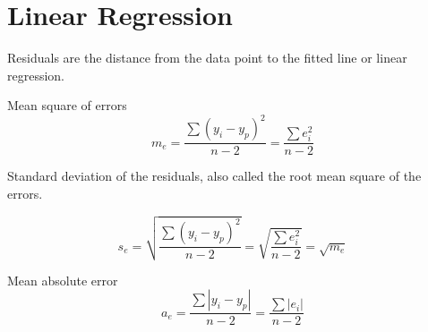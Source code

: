 	\chapter{Linear Regression}
Residuals are the distance from the data point to the fitted line or linear regression.

Mean square of errors
	\begin{equation}
		m_e = \frac{\sum \left(y_i - y_p\right)^2}{n-2} = \frac{\sum e_i^2}{n-2}
	\end{equation}

Standard deviation of the residuals, also called the root mean square of the errors.

	\begin{equation}
		s_e = \sqrt{\frac{\sum \left(y_i - y_p\right)^2}{n-2}} = \sqrt{\frac{\sum e_i^2}{n-2}} = \sqrt{m_e}
	\end{equation}

Mean absolute error
	\begin{equation}
		a_e = \frac{\sum \left|y_i - y_p\right|}{n-2} = \frac{\sum \left|e_i\right|}{n-2}
	\end{equation}

	\begin{mathwhere}
	\end{mathwhere}